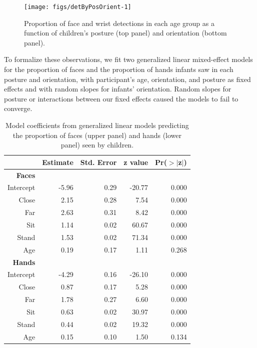 \documentclass[10pt, letterpaper]{article}
\newenvironment{CodeChunk}{}{}
\begin{document}
\begin{CodeChunk}
\begin{figure}[h]

{\centering \texttt{[image: figs/detByPosOrient-1]} 

}

\caption[Proportion of face and wrist detections in each age group as a function of children's posture (top panel) and orientation (bottom panel)]{Proportion of face and wrist detections in each age group as a function of children's posture (top panel) and orientation (bottom panel).}\label{fig:detByPosOrient}
\end{figure}
\end{CodeChunk}

To formalize these observations, we fit two generalized linear
mixed-effect models for the proportion of faces and the proportion of
hands infants saw in each posture and orientation, with participant's
age, orientation, and posture as fixed effects and with random slopes
for infants' orientation. Random slopes for posture or interactions
between our fixed effects caused the models to fail to converge.

\begin{table}[ht]
\centering
\begin{tabular}{rrrrr}
  \hline
 & Estimate & Std. Error & z value & Pr($>$$|$z$|$) \\ 
  \hline
  \textbf{Faces} \\
  Intercept & -5.96 & 0.29 & -20.77 & 0.000 \\ 
  Close & 2.15 & 0.28 & 7.54 & 0.000 \\ 
  Far & 2.63 & 0.31 & 8.42 & 0.000 \\ 
  Sit & 1.14 & 0.02 & 60.67 & 0.000 \\ 
  Stand & 1.53 & 0.02 & 71.34 & 0.000 \\ 
  Age & 0.19 & 0.17 & 1.11 & 0.268 \\ 
  \hline
  \textbf{Hands} \\
  Intercept & -4.29 & 0.16 & -26.10 & 0.000 \\ 
  Close & 0.87 & 0.17 & 5.28 & 0.000 \\ 
  Far & 1.78 & 0.27 & 6.60 & 0.000 \\ 
  Sit & 0.63 & 0.02 & 30.97 & 0.000 \\ 
  Stand & 0.44 & 0.02 & 19.32 & 0.000 \\ 
  Age & 0.15 & 0.10 & 1.50 & 0.134 \\ 
   \hline
\end{tabular}
\caption{Model coefficients from generalized linear models predicting the proportion of faces (upper panel) and hands (lower panel) seen by children.} 
\vspace{-1em}
\end{table}
\end{document}
